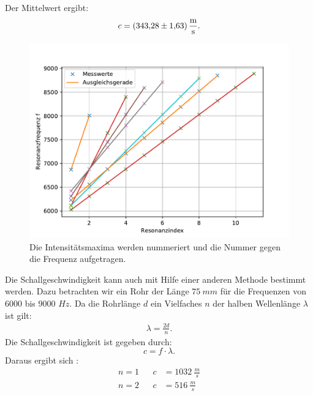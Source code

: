 Der Mittelwert ergibt:
\begin{align*}
  c=\SI{343.28\pm1.63}{\frac{m}{s}}.
\end{align*}
\begin{figure}[h!]
  \centering
  \includegraphics[width=\textwidth]{linearfit.pdf}
  \caption{Die Intensitätsmaxima werden nummeriert und die Nummer gegen die Frequenz aufgetragen.}
  \label{fig.linearfit}
\end{figure}
\FloatBarrier
Die Schallgeschwindigkeit kann auch mit Hilfe einer anderen Methode bestimmt werden.
Dazu betrachten wir ein Rohr der Länge $\SI{75}{mm}$ für die Frequenzen von 6000 bis 9000 $\si{Hz}$.
Da die Rohrlänge $d$ ein Vielfaches $n$ der halben Wellenlänge $\lambda$ ist gilt:
\begin{align*}
  \lambda = \frac{2d}{n}.
\end{align*}
Die Schallgeschwindigkeit ist gegeben durch:
\begin{equation*}
  c=f \cdot \lambda.
\end{equation*}
Daraus ergibt sich :
\begin{align*}
  n=1&&  c&=\SI{1032}{\frac{m}{s}}\\
  n=2&&  c&=\SI{516}{\frac{m}{s}}\\
\end{align*}
